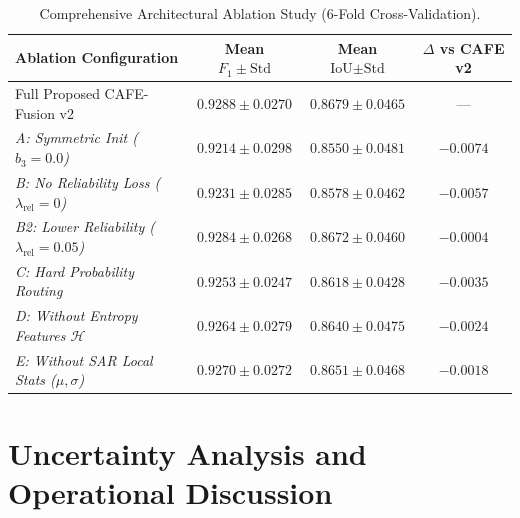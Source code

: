 \documentclass[conference]{IEEEtran}
\begin{document}
\begin{table}[!ht]
\centering
\caption{Comprehensive Architectural Ablation Study (6-Fold Cross-Validation).}
\label{tab:ablations}
\renewcommand{\arraystretch}{1.05}
\setlength{\tabcolsep}{3.5pt}
\scriptsize
\begin{tabularx}{\columnwidth}{X|c|c|c}
\hline
\textbf{Ablation Configuration} & \textbf{Mean $F_1 \pm \text{Std}$} & \textbf{Mean $\text{IoU} \pm \text{Std}$} & \textbf{$\Delta$ vs CAFE v2} \\
\hline
Full Proposed CAFE-Fusion v2 & $\mathbf{0.9288 \pm 0.0270}$ & $\mathbf{0.8679 \pm 0.0465}$ & --- \\
\hline
\textit{A: Symmetric Init ($b_3 = 0.0$)} & $0.9214 \pm 0.0298$ & $0.8550 \pm 0.0481$ & $-0.0074$ \\
\textit{B: No Reliability Loss ($\lambda_{\text{rel}} = 0$)} & $0.9231 \pm 0.0285$ & $0.8578 \pm 0.0462$ & $-0.0057$ \\
\textit{B2: Lower Reliability ($\lambda_{\text{rel}} = 0.05$)} & $0.9284 \pm 0.0268$ & $0.8672 \pm 0.0460$ & $-0.0004$ \\
\textit{C: Hard Probability Routing} & $0.9253 \pm 0.0247$ & $0.8618 \pm 0.0428$ & $-0.0035$ \\
\textit{D: Without Entropy Features $\mathcal{H}$} & $0.9264 \pm 0.0279$ & $0.8640 \pm 0.0475$ & $-0.0024$ \\
\textit{E: Without SAR Local Stats ($\mu, \sigma$)} & $0.9270 \pm 0.0272$ & $0.8651 \pm 0.0468$ & $-0.0018$ \\
\hline
\end{tabularx}
\end{table}

\section{Uncertainty Analysis and Operational Discussion}
\label{sec:discussion}
\end{document}
